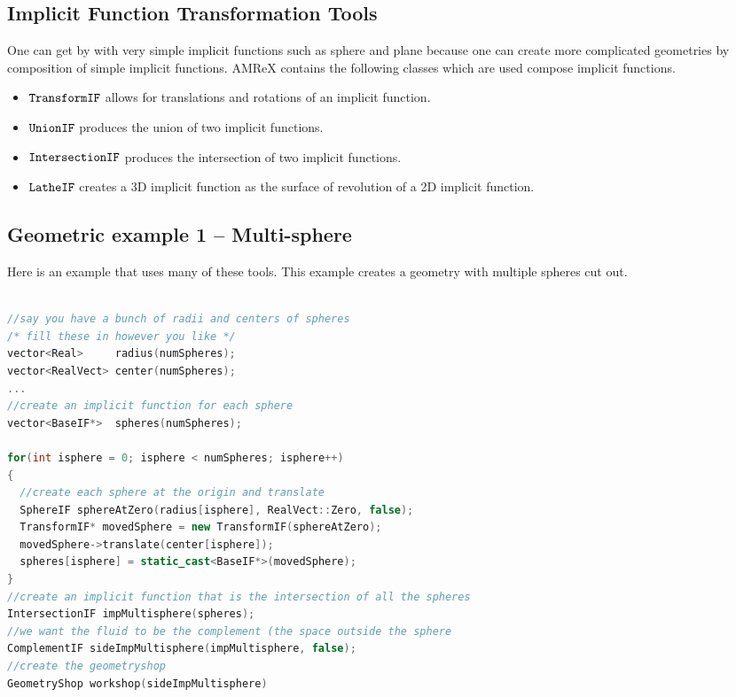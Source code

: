 \subsection{Implicit Function Transformation Tools}

One can get by with very simple implicit functions such as sphere and
plane because one can create more complicated geometries by
composition of simple implicit functions.    AMReX contains the
following classes which are used compose implicit functions.
\begin{itemize}
\item $\tt{TransformIF}$    allows for translations and rotations of an implicit function.
\item $\tt{UnionIF}$        produces the union of two implicit functions.  
\item $\tt{IntersectionIF}$ produces the intersection of two implicit functions.
\item $\tt{LatheIF}$        creates a 3D implicit function as the surface of
  revolution of a 2D implicit function.

\end{itemize}
\subsection{Geometric example 1 -- Multi-sphere}
Here is an example that uses many of these tools.  This example
creates a geometry with multiple spheres cut out.

\begin{lstlisting}[language=cpp]

//say you have a bunch of radii and centers of spheres
/* fill these in however you like */
vector<Real>     radius(numSpheres);
vector<RealVect> center(numSpheres);
...
//create an implicit function for each sphere
vector<BaseIF*>  spheres(numSpheres);

for(int isphere = 0; isphere < numSpheres; isphere++)
{
  //create each sphere at the origin and translate
  SphereIF sphereAtZero(radius[isphere], RealVect::Zero, false);
  TransformIF* movedSphere = new TransformIF(sphereAtZero);
  movedSphere->translate(center[isphere]);
  spheres[isphere] = static_cast<BaseIF*>(movedSphere);
}
//create an implicit function that is the intersection of all the spheres
IntersectionIF impMultisphere(spheres);
//we want the fluid to be the complement (the space outside the sphere
ComplementIF sideImpMultisphere(impMultisphere, false);
//create the geometryshop
GeometryShop workshop(sideImpMultisphere)
\end{lstlisting}

